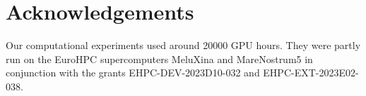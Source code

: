 \section*{Acknowledgements}
Our computational experiments used around 20000 GPU hours. They were partly run on the EuroHPC supercomputers MeluXina and MareNostrum5 in conjunction with the grants EHPC-DEV-2023D10-032 and EHPC-EXT-2023E02-038.
